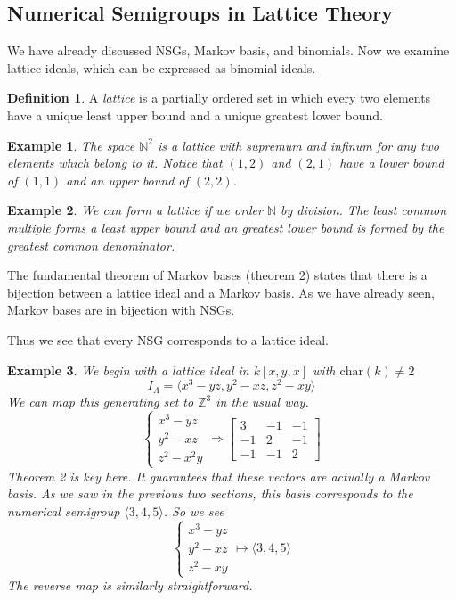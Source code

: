 \documentclass[11pt]{amsart}
\theoremstyle{plain}
\newtheorem{exa}{Example}
\theoremstyle{definition}
\newtheorem{defi}{Definition}
\begin{document}
\subsection{Numerical Semigroups in Lattice Theory}
We have already discussed NSGs, Markov basis, and binomials. Now we examine lattice ideals, which can be expressed as binomial ideals.
\begin{defi}
\cite{stanley}
A \emph{lattice} is a partially ordered set in which every two elements have a
unique least upper bound and a unique greatest lower bound.
\end{defi}
\begin{exa}
The space $\mathbb{N}^2$ is a lattice with supremum and infinum for any two elements which
belong to it. Notice that $(1,2)$ and $(2,1)$ have a lower bound of $(1,1)$ and
an upper bound of $(2,2)$.
\end{exa}
\begin{exa}
We can form a lattice if we order $\mathbb{N}$ by division. The least common
multiple forms a least upper bound and an greatest lower bound is formed by the
greatest common denominator.
\end{exa}
The fundamental theorem of Markov bases (theorem 2)
states that there is a bijection between a lattice ideal and a Markov basis. As
we have already seen, Markov bases are in bijection with NSGs.

Thus we see that every NSG corresponds to a lattice ideal.

\begin{exa}
  We begin with a lattice ideal in $k[x,y,x]$ with $\text{char}(k)\ne 2$
  \[
  I_\Lambda=\langle x^3-yz,y^2-xz,z^2-xy\rangle
  \]
  We can map this generating set to $\mathbb{Z}^3$ in the usual way.
  \[
  \begin{cases}
    x^3-yz\\
    y^2-xz\\
    z^2-x^2y
  \end{cases}
  \Rightarrow
  \left[\begin{array}{rrr}
    3&-1&-1\\
    -1&2&-1\\
    -1&-1&2
  \end{array}\right]
  \]
  Theorem 2 is key here. It guarantees that these vectors are
  actually a Markov basis. As we saw in the previous two sections, this basis
  corresponds to the numerical semigroup $\langle 3,4,5\rangle$. So we see
  \[
  \begin{cases}
    x^3-yz\\
    y^2-xz\\
    z^2-xy
  \end{cases}
  \mapsto\langle 3,4,5\rangle
  \]
  The reverse map is similarly straightforward.
\end{exa}
\end{document}
